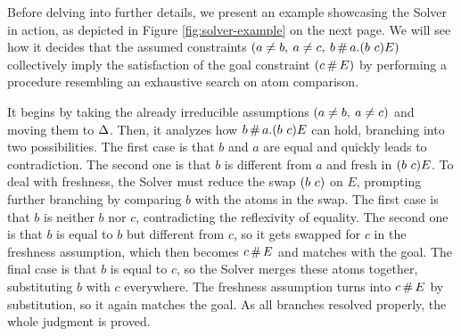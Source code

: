 \documentclass[english, mgr]{iithesis}
\begin{document}
Before delving into further details, we present an example showcasing the Solver in action, as depicted in Figure \ref{fig:solver-example} on the next page.
We will see how it decides that the assumed constraints $(a \neq b,\: a \neq c,\: b \,\#\, a.(b\ c) E)$
collectively imply the satisfaction of the goal constraint $(c \,\#\, E)$
by performing a procedure resembling an exhaustive search on atom comparison.

It begins by taking the already irreducible assumptions $(a \neq b,\: a \neq c)$ and moving them to $\Delta$.
Then, it analyzes how $b \,\#\, a.(b\ c) E$
can hold, branching into two possibilities.
The first case is that $b$ and $a$ are equal and quickly leads to contradiction.
The second one is that $b$ is different from $a$ and fresh in $(b\ c) E$.
To deal with freshness, the Solver must reduce the swap $\permswap{b}{c}$ on $E$,
prompting further branching by comparing $b$ with the atoms in the swap.
The first case is that $b$ is neither $b$ nor $c$, contradicting the reflexivity of equality.
The second one is that $b$ is equal to $b$ but different from $c$, so it gets swapped for $c$
in the freshness assumption, which then becomes $c \,\#\, E$ and matches with the goal.
The final case is that $b$ is equal to $c$, so the Solver merges these atoms together,
substituting $b$ with $c$ everywhere.
The freshness assumption turns into $c \,\#\, E$ by substitution, so it again matches the goal.
As all branches resolved properly, the whole judgment is proved.
\end{document}
